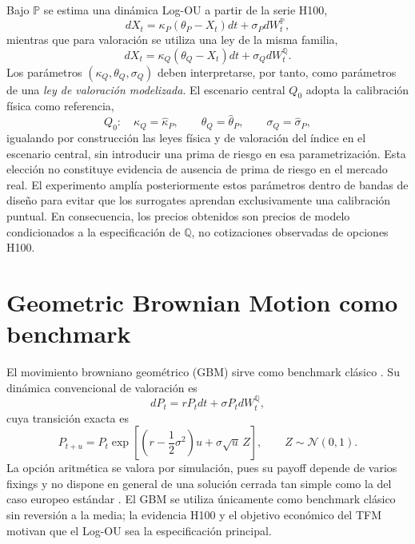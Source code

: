Bajo $\mathbb P$ se estima una dinámica Log-OU a partir de la serie H100,
\begin{equation}
    dX_t=\kappa_P(\theta_P-X_t)dt+\sigma_PdW_t^{\mathbb P},
    \label{eq:logou_p}
\end{equation}
mientras que para valoración se utiliza una ley de la misma familia,
\begin{equation}
    dX_t=\kappa_Q(\theta_Q-X_t)dt+\sigma_QdW_t^{\mathbb Q}.
    \label{eq:logou_q}
\end{equation}
Los parámetros $(\kappa_Q,\theta_Q,\sigma_Q)$ deben interpretarse, por tanto,
como parámetros de una \emph{ley de valoración modelizada}. El escenario central
$Q_0$ adopta la calibración física como referencia,
\begin{equation}
    Q_0:\quad
    \kappa_Q=\widehat\kappa_P,\qquad
    \theta_Q=\widehat\theta_P,\qquad
    \sigma_Q=\widehat\sigma_P,
    \label{eq:q0}
\end{equation}
igualando por construcción las leyes física y de valoración del índice en el
escenario central, sin introducir una prima de riesgo en esa parametrización.
Esta elección no constituye evidencia de ausencia de prima de riesgo en el mercado real. El experimento amplía posteriormente estos parámetros dentro de bandas
de diseño para evitar que los surrogates aprendan exclusivamente una calibración
puntual. En consecuencia, los precios obtenidos son precios de modelo
condicionados a la especificación de $\mathbb Q$, no cotizaciones observadas de
opciones H100.


\section{Geometric Brownian Motion como benchmark}
\label{sec:gbm_benchmark}

El movimiento browniano geométrico (GBM) sirve como benchmark clásico
\parencite{black_scholes_1973,merton_1973,uned_mod7_2026}. Su dinámica convencional
de valoración es
\begin{equation}
    dP_t=rP_tdt+\sigma P_tdW_t^{\mathbb Q},
    \label{eq:gbm_q}
\end{equation}
cuya transición exacta es
\begin{equation}
    P_{t+u}=P_t\exp\left[\left(r-\frac{1}{2}\sigma^2\right)u
    +\sigma\sqrt{u}\,Z\right],\qquad Z\sim\mathcal N(0,1).
    \label{eq:gbm_exact}
\end{equation}
La opción aritmética se valora por simulación, pues su payoff depende de varios
fixings y no dispone en general de una solución cerrada tan simple como la del
caso europeo estándar \parencite{kemna_vorst_1990,glasserman_2004}. El GBM se
utiliza únicamente como benchmark clásico sin reversión a la media; la evidencia
H100 y el objetivo económico del TFM motivan que el Log-OU sea la especificación
principal.


